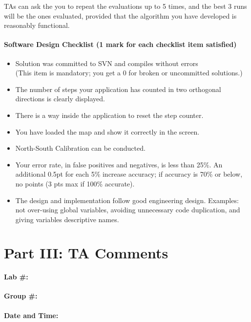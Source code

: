 \documentclass[10pt]{article}
\begin{document}
TAs can ask the you to repeat the evaluations up to 5 times, and the best 3 runs will be the ones evaluated, provided that the algorithm you have developed is reasonably functional.

\paragraph{Software Design Checklist (1 mark for each checklist item satisfied)}
\begin{itemize}
\renewcommand{\labelitemi}{$\Box$}
\item Solution was committed to SVN and compiles without errors \\
(This item is mandatory; you get a 0 for broken or uncommitted solutions.)
\item The number of steps your application has counted in two orthogonal directions is clearly displayed.
\item There is a way inside the application to reset the step counter.
\item You have loaded the map and show it correctly in the screen.
\item North-South Calibration can be conducted.
\renewcommand{\labelitemi}{$\Box\Box\Box\Box\Box\Box$}
\item Your error rate, in false positives and negatives, is less than 25\%. An additional 0.5pt for each 5\% increase accuracy; if accuracy is 70\% or below, no points (3 pts max if 100\% accurate).
\renewcommand{\labelitemi}{$\Box\Box$}
\item The design and implementation follow good engineering design. Examples: not over-using global variables, avoiding unnecessary code duplication, and giving variables descriptive names.
\end{itemize}


\newpage
\newpage
\section*{Part III: TA Comments}

\paragraph{Lab \#:}
\paragraph{Group \#:}
\paragraph{Date and Time:}
\end{document}
